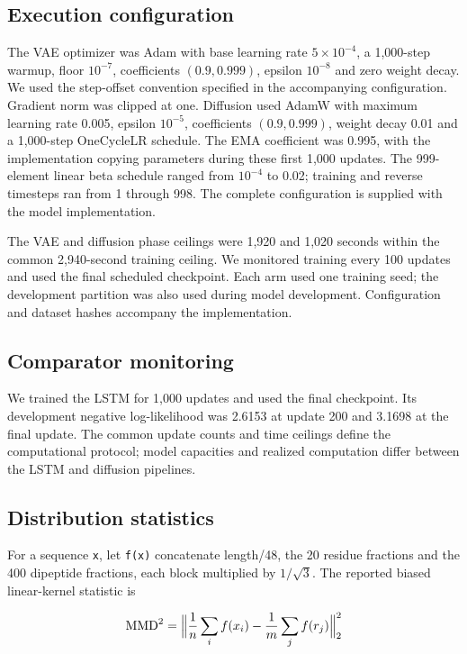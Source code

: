 \documentclass[11pt,a4paper]{article}
\begin{document}
\subsection*{Execution configuration}
The VAE optimizer was Adam with base learning rate $5\times10^{-4}$, a 1,000-step warmup, floor $10^{-7}$, coefficients $(0.9,0.999)$, epsilon $10^{-8}$ and zero weight decay. We used the step-offset convention specified in the accompanying configuration. Gradient norm was clipped at one. Diffusion used AdamW with maximum learning rate 0.005, epsilon $10^{-5}$, coefficients $(0.9,0.999)$, weight decay 0.01 and a 1,000-step OneCycleLR schedule. The EMA coefficient was 0.995, with the implementation copying parameters during these first 1,000 updates. The 999-element linear beta schedule ranged from $10^{-4}$ to 0.02; training and reverse timesteps ran from 1 through 998. The complete configuration is supplied with the model implementation.

The VAE and diffusion phase ceilings were 1,920 and 1,020 seconds within the common 2,940-second training ceiling. We monitored training every 100 updates and used the final scheduled checkpoint. Each arm used one training seed; the development partition was also used during model development. Configuration and dataset hashes accompany the implementation.

\subsection*{Comparator monitoring}
We trained the LSTM for 1,000 updates and used the final checkpoint. Its development negative log-likelihood was 2.6153 at update 200 and 3.1698 at the final update. The common update counts and time ceilings define the computational protocol; model capacities and realized computation differ between the LSTM and diffusion pipelines.

\subsection*{Distribution statistics}
For a sequence \texttt{x}, let \texttt{f(x)} concatenate length/48, the 20 residue fractions and the 400 dipeptide fractions, each block multiplied by $1/\sqrt{3}$. The reported biased linear-kernel statistic is

\begin{equation*}
\mathrm{MMD}^{2} = \Bigl\lVert \frac{1}{n}\sum_{i} f(x_{i}) - \frac{1}{m}\sum_{j} f(r_{j}) \Bigr\rVert_{2}^{2}
\end{equation*}
\end{document}
